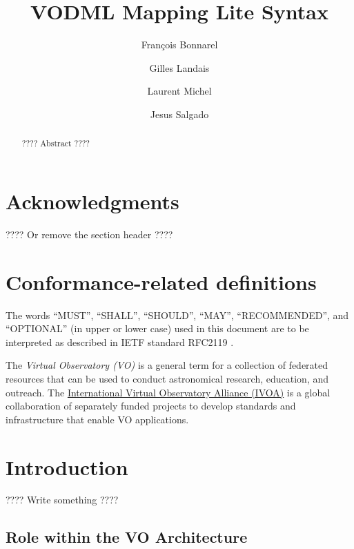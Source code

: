 \documentclass[11pt,a4paper]{ivoa}
\title{VODML Mapping Lite Syntax}
\author{François Bonnarel}
\author{Gilles Landais}
\author{Laurent Michel}
\author{Jesus Salgado}
\begin{document}
\begin{abstract}
???? Abstract ????
\end{abstract}


\section*{Acknowledgments}

???? Or remove the section header ????

\section*{Conformance-related definitions}

The words ``MUST'', ``SHALL'', ``SHOULD'', ``MAY'', ``RECOMMENDED'', and
``OPTIONAL'' (in upper or lower case) used in this document are to be
interpreted as described in IETF standard RFC2119 \citep{std:RFC2119}.

The \emph{Virtual Observatory (VO)} is a
general term for a collection of federated resources that can be used
to conduct astronomical research, education, and outreach.
The \href{http://www.ivoa.net}{International
Virtual Observatory Alliance (IVOA)} is a global
collaboration of separately funded projects to develop standards and
infrastructure that enable VO applications.


\section{Introduction}

???? Write something ????

\lstset{language=XML}

\subsection{Role within the VO Architecture}
\end{document}
